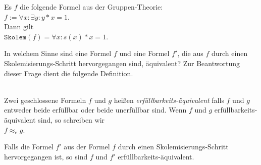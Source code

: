 \example
Es $f$ die folgende Formel aus der Gruppen-Theorie:
\\[0.2cm]
\hspace*{1.3cm}
$f := \forall x: \exists y: y * x = 1$. 
\\[0.2cm]
Dann gilt
\\[0.2cm]
\hspace*{1.3cm}
$\mathtt{Skolem}(f) = \forall x : s(x) * x = 1$.  \eox

\noindent
In welchem Sinne sind eine Formel $f$ und eine Formel $f'$, die aus $f$ durch einen 
Skolem\-isierungs-Schritt hervorgegangen sind, \"{a}quivalent?  Zur Beantwortung dieser Frage
dient die folgende Definition. 

\begin{Definition} \hspace*{\fill} \\
   Zwei geschlossene Formeln $f$ und $g$ hei\ss{}en 
   {\emph{\color{blue}erf\"{u}llbarkeits-\"{a}quivalent}}
   falls $f$ und $g$ entweder beide erf\"{u}llbar oder beide unerf\"{u}llbar sind.
   Wenn $f$ und $g$ erf\"{u}llbarkeits-\"{a}quivalent sind, so schreiben wir \\[0.2cm]
   \hspace*{1.3cm} $f \approx_e g$.
\eox
\end{Definition}


\noindent
\begin{Satz}
  Falls die Formel $f'$ aus der Formel $f$ durch einen Skolemisierungs-Schritt 
  hervorgegangen ist, so sind $f$ und $f'$ erf\"{u}llbarkeits-\"{a}quivalent.
\end{Satz}



